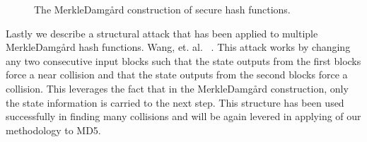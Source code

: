 \documentclass[letterpaper,twocolumn,10pt]{article}
\begin{document}
\begin{figure}
\begin{center}
\end{center}
\caption{\label{fig:merkleconstruction} The Merkle{\textendash}Damg\r{a}rd construction of secure hash functions.}
\end{figure} 


Lastly we describe a structural attack that has been applied to multiple Merkle{\textendash}Damg\r{a}rd hash functions. Wang, et. al. ~\cite{wang2005break}. This attack works by changing any two consecutive input blocks such that the state outputs from the first blocks force a near collision and that the state outputs from the second blocks force a collision. This leverages the fact that in the Merkle{\textendash}Damg\r{a}rd construction, only the state information is carried to the next step. This structure has been used successfully in finding many collisions and will be again levered in applying of our methodology to MD5. 

\end{document}
